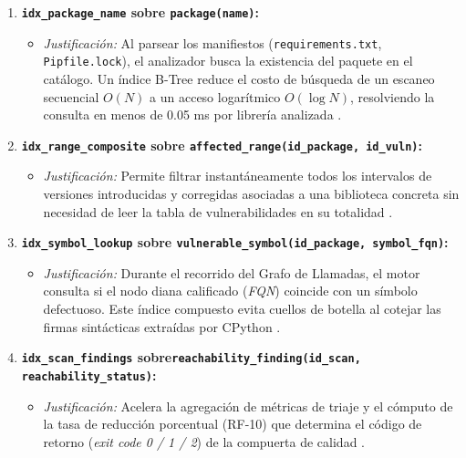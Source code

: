 \begin{enumerate}
    \item \textbf{\texttt{idx\_\allowbreak package\_\allowbreak name} sobre \texttt{package(name)}:}
    \begin{itemize}
        \item \textit{Justificación:} Al parsear los manifiestos (\texttt{requirements.\allowbreak txt}, \texttt{Pipfile.\allowbreak lock}), el analizador busca la existencia del paquete en el catálogo. Un índice B-Tree reduce el costo de búsqueda de un escaneo secuencial $O(N)$ a un acceso logarítmico $O(\log N)$, resolviendo la consulta en menos de 0.05 ms por librería analizada \cite{openssf2023osv}.
    \end{itemize}

    \item \textbf{\texttt{idx\_\allowbreak range\_\allowbreak composite} sobre \texttt{affected\_\allowbreak range(id\_\allowbreak package, id\_\allowbreak vuln)}:}
    \begin{itemize}
        \item \textit{Justificación:} Permite filtrar instantáneamente todos los intervalos de versiones introducidas y corregidas asociadas a una biblioteca concreta sin necesidad de leer la tabla de vulnerabilidades en su totalidad \cite{openssf2023osv, pashchenko2022vuln4real}.
    \end{itemize}

    \item \textbf{\texttt{idx\_\allowbreak symbol\_\allowbreak lookup} sobre \texttt{vulnerable\_\allowbreak symbol(id\_\allowbreak package, symbol\_\allowbreak fqn)}:}
    \begin{itemize}
        \item \textit{Justificación:} Durante el recorrido del Grafo de Llamadas, el motor consulta si el nodo diana calificado (\textit{FQN}) coincide con un símbolo defectuoso. Este índice compuesto evita cuellos de botella al cotejar las firmas sintácticas extraídas por CPython \cite{salis2021pycg}.
    \end{itemize}

    \item \textbf{\texttt{idx\_\allowbreak scan\_\allowbreak findings} sobre\newline\texttt{reachability\_\allowbreak finding(id\_\allowbreak scan, reachability\_\allowbreak status)}:}
    \begin{itemize}
        \item \textit{Justificación:} Acelera la agregación de métricas de triaje y el cómputo de la tasa de reducción porcentual (RF-10) que determina el código de retorno (\textit{exit code 0 / 1 / 2}) de la compuerta de calidad \cite{humble2010continuous, torres2026proyecto}.
    \end{itemize}
\end{enumerate}


